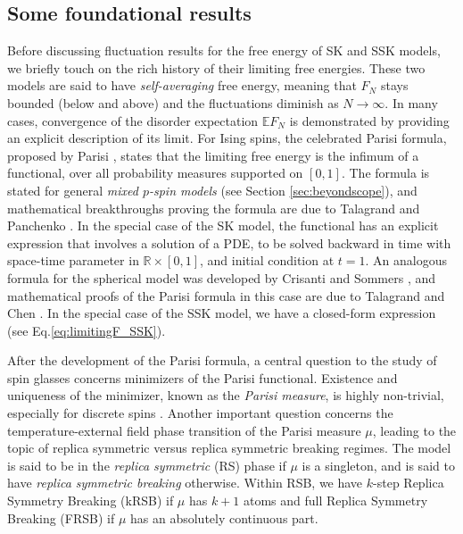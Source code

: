 \documentclass[11pt]{article}
\numberwithin{equation}{section}
\newcommand{\bR}{\mathbb{R}}
\newcommand{\bE}{\mathbb{E}}
\theoremstyle{remark}
\begin{document}
\subsection{Some foundational results}

Before discussing fluctuation results for the free energy of SK and SSK models, we briefly touch on the rich history of their limiting free energies. These two models are said to have \textit{self-averaging} free energy, meaning that $F_N$ stays bounded (below and above) and the fluctuations diminish as $N \to \infty$. In many cases, convergence of the disorder expectation $\bE F_N$ is demonstrated by providing an explicit description of its limit. For Ising spins, the celebrated Parisi formula, proposed by Parisi \cite{Parisi1979, Parisi1980}, states that the limiting free energy is the infimum of a functional, over all probability measures supported on $[0,1]$. The formula is stated for general \textit{mixed $p$-spin models} (see Section \ref{sec:beyondscope}), and mathematical breakthroughs proving the formula are due to Talagrand \cite{TalagrandSK} and Panchenko \cite{Panchenk14}. In the special case of the SK model, the functional has an explicit expression that involves a solution of a PDE, to be solved backward in time with space-time parameter in $\bR \times [0,1]$, and initial condition at $t=1$. An analogous formula for the spherical model was developed by Crisanti and Sommers \cite{crisanti1992sphericalp}, and mathematical proofs of the Parisi formula in this case are due to Talagrand \cite{TalagrandSSK} and Chen \cite{Chen13}. In the special case of the SSK model, we have a closed-form expression (see Eq.\@ \eqref{eq:limitingF_SSK}).

After the development of the Parisi formula, a central question to the study of spin glasses concerns minimizers of the Parisi functional. Existence and uniqueness of the minimizer, known as the \textit{Parisi measure}, is highly non-trivial, especially for discrete spins \cite{AC15_unique}. Another important question concerns the temperature-external field phase transition of the Parisi measure $\mu$, leading to the topic of replica symmetric versus replica symmetric breaking regimes. The model is said to be in the \textit{replica symmetric} (RS) phase if $\mu$ is a singleton, and is said to have \textit{replica symmetric breaking} otherwise. Within RSB, we have $k$-step Replica Symmetry Breaking (kRSB) if $\mu$ has $k+1$ atoms and full Replica Symmetry Breaking (FRSB) if $\mu$ has an absolutely continuous part. 
\end{document}

